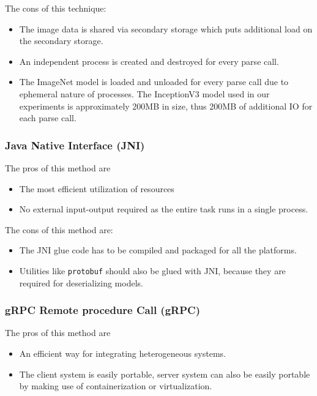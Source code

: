 The cons of this technique:
\begin{itemize}
	\item The image data is shared via secondary storage which puts additional load on the secondary storage.
	\item An independent process is created and destroyed for every parse call.
	\item The ImageNet model is loaded and unloaded for every parse call due to ephemeral nature of processes. The InceptionV3 model used in our experiments is approximately 200MB in size, thus 200MB of additional IO for each parse call.
\end{itemize}

\subsubsection{Java Native Interface (JNI)} \label{sec:eval-jni}

The pros of this method are
\begin{itemize}
	\item The most efficient utilization of resources
	\item No external input-output required as the entire task runs in a single process.
\end{itemize}

The cons of this method are:
\begin{itemize}
	\item The JNI glue code has to be compiled and packaged for all the platforms.
	\item Utilities like \texttt{protobuf} should also be glued with JNI, because they are required for deserializing models\cite{javacpp-240}.
\end{itemize}

\subsubsection{gRPC Remote procedure Call (gRPC)} \label{sec:eval-rpc}

The pros of this method are
\begin{itemize}
	\item An efficient way for integrating heterogeneous systems.
	\item The client system is easily portable, server system can also be easily portable by making use of containerization or virtualization.
\end{itemize}

